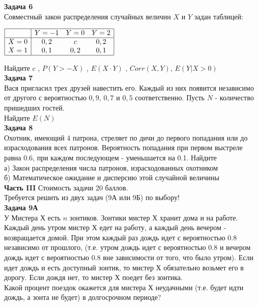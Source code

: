 \documentclass[pdftex,12pt,a4paper]{article}
\begin{document}
\newpage
\textbf{Задача 6} \\ %
Совместный закон распределения случайных величин  $X$  и  $Y$
задан таблицей:

$\begin{array}{|c|ccc|} 
\hline 
{} & {Y=-1} & {Y=0} & {Y=2}\\  
\hline 
{X=0} & {0,2} & {c} & {0,2}\\ 
{X=1} & {0,1} & {0,2} & {0,1} \\  
\hline  
\end{array}$

Найдите  $c$ ,  $P\left(Y>-X\right)$ ,  $E\left(X\cdot Y
\right)$ , $Corr(X,Y)$, $E\left(Y|X>0\right)$ \\

\textbf{Задача 7} \\ %
Вася пригласил трех друзей навестить его. Каждый из них появится
независимо от другого с вероятностью $0,9$, $0,7$ и $0,5$
соответственно. Пусть $N$ - количество пришедших гостей. \\
Найдите $E(N)$ \\


\textbf{Задача 8} \\ %
Охотник, имеющий 4 патрона, стреляет по дичи до первого
попадания или до израсходования всех патронов. Вероятность
попадания при первом выстреле равна 0.6, при каждом последующем -
уменьшается на 0.1. Найдите \\
а) Закон распределения числа патронов, израсходованных охотником \\
б) Математическое ожидание и дисперсию этой случайной величины \\



\textbf{Часть III} Стоимость задачи 20 баллов. \\

Требуется решить \textbf{} из двух задач (9А или 9Б) по
выбору! \\

\textbf{Задача 9А} \\
У Мистера Х есть $n$ зонтиков. Зонтики мистер Х хранит дома и на работе. Каждый день утром мистер Х едет на работу, а каждый день вечером - возвращается домой. При этом каждый раз дождь идет с вероятностью 0.8 независимо от прошлого, (т.е. утром дождь идет с вероятностью 0.8 и вечером дождь идет с вероятностью 0.8 вне зависимости от того, что было утром). Если идет дождь и есть доступный зонтик, то мистер Х обязательно возьмет его в дорогу. Если дождя нет, то мистер Х поедет без зонтика. \\
Какой процент поездок окажется для мистера Х неудачными (т.е. будет идти дождь, а зонта не будет) в долгосрочном периоде? \\
\end{document}

